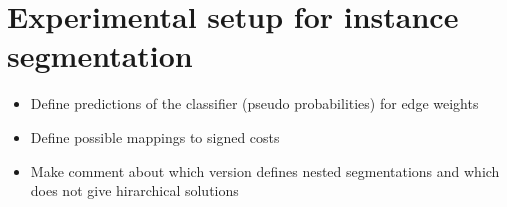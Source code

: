 
\section{Experimental setup for instance segmentation}
\begin{itemize}
\item Define predictions of the classifier (pseudo probabilities) for edge weights
\item Define possible mappings to signed costs
\item Make comment about which version defines nested segmentations and which does not give hirarchical solutions

\end{itemize}
